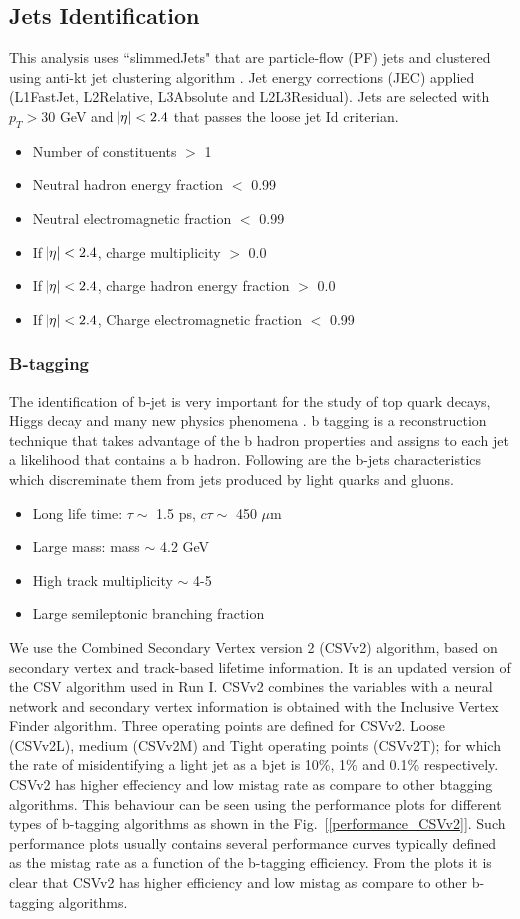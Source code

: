 \documentclass{cmspaper}
\begin{document}
\subsection{Jets Identification}
This analysis uses ``slimmedJets" that are particle-flow (PF) jets and clustered using anti-kt jet clustering algorithm \cite{Akt}\cite{jet-reco}. Jet energy corrections (JEC) applied (L1FastJet, L2Relative, L3Absolute and L2L3Residual). Jets are selected with $p_{T} > 30$ GeV and $\abs {\eta} < 2.4$ that passes the loose jet Id criterian.
\begin{itemize}
\item Number of constituents $>$ 1
\item Neutral hadron energy fraction $<$ 0.99
\item Neutral electromagnetic fraction $<$ 0.99
\item If $\abs {\eta} < 2.4$, charge multiplicity $>$ 0.0 
\item If $\abs {\eta} < 2.4$, charge hadron energy fraction $>$ 0.0
\item If $\abs {\eta} < 2.4$, Charge electromagnetic fraction $<$ 0.99
\end{itemize}   
\subsubsection{B-tagging}
The identification of b-jet is very important for the study of top quark decays, Higgs decay and many new physics phenomena \cite{bjet}. b tagging is a reconstruction technique that takes advantage of the b hadron properties and assigns to each jet a likelihood that contains a b hadron. Following are the b-jets characteristics which discreminate them from jets produced by light quarks and gluons.
\begin{itemize}
\item Long life time: $\tau \sim$ 1.5 ps, $c\tau \sim$ 450 $\mu $m
\item Large mass: mass $\sim$ 4.2 GeV 
\item High track multiplicity $\sim$ 4-5
\item Large semileptonic branching fraction 
\end{itemize}
We use the Combined Secondary Vertex version 2 (CSVv2) algorithm, based on secondary vertex and track-based lifetime information. It is an updated version of the CSV algorithm used in Run I. CSVv2 combines the variables with a neural network and secondary vertex information is obtained with the Inclusive Vertex Finder algorithm. Three operating points are defined for CSVv2.
Loose (CSVv2L), medium (CSVv2M) and Tight operating points (CSVv2T); for which the rate of misidentifying a light jet as a bjet is 10\%, 1\% and 0.1\% respectively.
CSVv2 has higher effeciency and low mistag rate as compare to other btagging algorithms. This behaviour can be seen using the performance plots for different types of b-tagging algorithms as shown in the Fig.~[\ref{performance_CSVv2}]. Such performance plots usually contains several performance curves typically defined as the mistag rate as a function of the b-tagging efficiency. From the plots it is clear that CSVv2 has higher efficiency and low mistag as compare to other b-tagging algorithms.   
\end{document}
